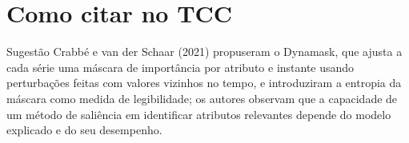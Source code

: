 \documentclass[11pt,a4paper]{article}
\begin{document}
\section{Como citar no TCC}
\begin{infobox}[ok]{Sugestão}
Crabbé e van der Schaar (2021) propuseram o Dynamask, que ajusta a cada série uma máscara de importância por atributo e instante usando perturbações feitas com valores vizinhos no tempo, e introduziram a entropia da máscara como medida de legibilidade; os autores observam que a capacidade de um método de saliência em identificar atributos relevantes depende do modelo explicado e do seu desempenho.
\end{infobox}
\end{document}
